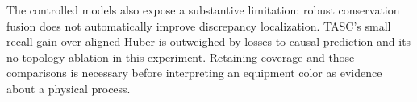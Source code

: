 \documentclass[11pt,a4paper]{article}
\begin{document}
The controlled models also expose a substantive limitation: robust conservation fusion does not automatically improve discrepancy localization. TASC's small recall gain over aligned Huber is outweighed by losses to causal prediction and its no-topology ablation in this experiment. Retaining coverage and those comparisons is necessary before interpreting an equipment color as evidence about a physical process.


\end{document}
